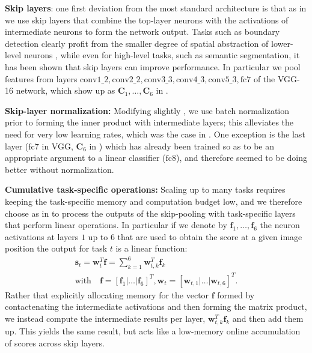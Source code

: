 \documentclass[10pt,twocolumn,letterpaper]{article}
\begin{document}
{\textbf{Skip layers}}: one first deviation from the most standard architecture is that as in \cite{SEZM+14,hariharan2014hypercolumns,hed,iclr16} we use skip layers that combine the top-layer neurons with the activations of intermediate neurons to form the network output. Tasks such as boundary detection clearly profit from the smaller degree of spatial abstraction of lower-level neurons \cite{hed}, while even for high-level tasks, such as semantic segmentation, it has been shown \cite{hariharan2014hypercolumns,LongSD15} that  skip layers can improve performance. In particular  we pool features from layers  $\mathrm{conv1\_2, conv2\_2, conv3\_3, conv4\_3, conv5\_3, fc7}$ of the VGG-16 network, which show up as $\mathbf{C}_1,\ldots,\mathbf{C}_6$ in . 

{\textbf{Skip-layer normalization:}} Modifying slightly \cite{parsenet,bell16ion}, we  use batch normalization \cite{batchnorm} prior to forming the inner product with intermediate layers; this alleviates the need for very low learning rates, which was the case in \cite{hed,iclr16}. One exception is the last layer ($\mathrm{fc7}$ in VGG, $\mathbf{C}_6$ in ) which has already been trained so as to be an appropriate argument to a linear classifier ($\mathrm{fc8}$), and therefore seemed  to be doing better without normalization.



\newcommand{\neuron}{\mathbf{f}}
\newcommand{\scoret}{\mathbf{s}}
\newcommand{\weight}{\mathbf{w}}
\newcommand{\is}{}

{\textbf{Cumulative task-specific operations:}}
Scaling up to many tasks requires  keeping the task-specific memory  and computation budget low, and we therefore choose as in  \cite{hed,iclr16} to process the outputs of the skip-pooling with task-specific layers that perform linear operations.   In particular if we denote by
 $\neuron_1\is,\ldots,\neuron_6\is$ the  neuron activations at layers $1$ up to $6$ that are used to obtain the score at a given image position 
  the output for task $t$ is a linear function:
 \begin{gather}
 \scoret_t = \weight^T_t \neuron  = \sum_{k=1}^{6} \weight^T_{t,k} \neuron_k \\
 \mathrm{with}\quad \neuron =
 \left[\neuron_1 |	  \hdots | \neuron_6 \right]^T, \weight_t = \left[
 \weight_{t,1} |
 \hdots | \weight_{t,6}
 \right]^T.
 	 \end{gather}	 
 	Rather that explicitly allocating memory for the vector $\neuron$ formed by contactenating the intermediate activations and then forming the matrix product,
 	we instead compute the intermediate results per layer, $\weight^T_{t,k} \neuron_k$ and then add them up. This  yields the same result, but acts like a low-memory  online accumulation of scores across skip layers. 
 	
\end{document}

